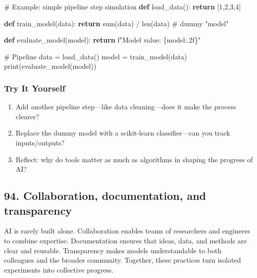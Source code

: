 \documentclass[
  letterpaper,
  DIV=11,
  numbers=noendperiod]{scrreprt}
\newenvironment{Shaded}{\begin{snugshade}}{\end{snugshade}}
\newcommand{\BuiltInTok}[1]{\textcolor[rgb]{0.00,0.23,0.31}{#1}}
\newcommand{\CommentTok}[1]{\textcolor[rgb]{0.37,0.37,0.37}{#1}}
\newcommand{\ControlFlowTok}[1]{\textcolor[rgb]{0.00,0.23,0.31}{\textbf{#1}}}
\newcommand{\DecValTok}[1]{\textcolor[rgb]{0.68,0.00,0.00}{#1}}
\newcommand{\KeywordTok}[1]{\textcolor[rgb]{0.00,0.23,0.31}{\textbf{#1}}}
\newcommand{\NormalTok}[1]{\textcolor[rgb]{0.00,0.23,0.31}{#1}}
\newcommand{\OperatorTok}[1]{\textcolor[rgb]{0.37,0.37,0.37}{#1}}
\newcommand{\SpecialCharTok}[1]{\textcolor[rgb]{0.37,0.37,0.37}{#1}}
\newcommand{\SpecialStringTok}[1]{\textcolor[rgb]{0.13,0.47,0.30}{#1}}
\providecommand{\tightlist}{%
  \setlength{\itemsep}{0pt}\setlength{\parskip}{0pt}}
\begin{document}
\begin{Shaded}
\begin{Highlighting}[]
\CommentTok{\# Example: simple pipeline step simulation}
\KeywordTok{def}\NormalTok{ load\_data():}
    \ControlFlowTok{return}\NormalTok{ [}\DecValTok{1}\NormalTok{,}\DecValTok{2}\NormalTok{,}\DecValTok{3}\NormalTok{,}\DecValTok{4}\NormalTok{]}

\KeywordTok{def}\NormalTok{ train\_model(data):}
    \ControlFlowTok{return} \BuiltInTok{sum}\NormalTok{(data) }\OperatorTok{/} \BuiltInTok{len}\NormalTok{(data)  }\CommentTok{\# dummy "model"}

\KeywordTok{def}\NormalTok{ evaluate\_model(model):}
    \ControlFlowTok{return} \SpecialStringTok{f"Model value: }\SpecialCharTok{\{}\NormalTok{model}\SpecialCharTok{:.2f\}}\SpecialStringTok{"}

\CommentTok{\# Pipeline}
\NormalTok{data }\OperatorTok{=}\NormalTok{ load\_data()}
\NormalTok{model }\OperatorTok{=}\NormalTok{ train\_model(data)}
\BuiltInTok{print}\NormalTok{(evaluate\_model(model))}
\end{Highlighting}
\end{Shaded}

\subsubsection{Try It Yourself}\label{try-it-yourself-92}

\begin{enumerate}
\def\labelenumi{\arabic{enumi}.}
\tightlist
\item
  Add another pipeline step---like data cleaning---does it make the
  process clearer?
\item
  Replace the dummy model with a scikit-learn classifier---can you track
  inputs/outputs?
\item
  Reflect: why do tools matter as much as algorithms in shaping the
  progress of AI?
\end{enumerate}

\subsection{94. Collaboration, documentation, and
transparency}\label{collaboration-documentation-and-transparency}

AI is rarely built alone. Collaboration enables teams of researchers and
engineers to combine expertise. Documentation ensures that ideas, data,
and methods are clear and reusable. Transparency makes models
understandable to both colleagues and the broader community. Together,
these practices turn isolated experiments into collective progress.
\end{document}
